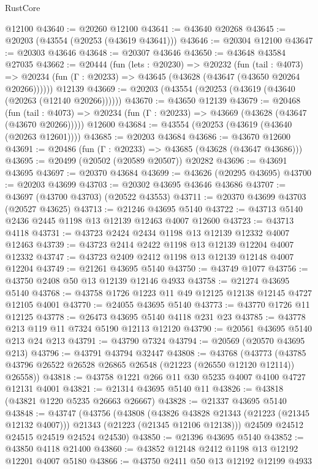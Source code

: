 \begin{lexlean}{RustCore}
\begin{coremodule}
    @12100
@43640 := @20260 @12100
@43641 := @43640 @20268
@43645 := @20203 (@43554 (@20253 (@43619 @43641)))
@43646 := @20304 @12100
@43647 := @20303 @43646
@43648 := @20307 @43646
@43650 := @43648 @43584 @27035
@43662 := @20444
    (fun (lets : @20230) =>
    @20232
      (fun (tail : @4073) =>
      @20234 (fun (Γ : @20233) => @43645 (@43628 (@43647 (@43650 @20264 @20266))))))
    @12139
@43669 := @20203 (@43554 (@20253 (@43619 (@43640 (@20263 (@12140 @20266))))))
@43670 := @43650 @12139
@43679 := @20468
    (fun (tail : @4073) => @20234 (fun (Γ : @20233) => @43669 (@43628 (@43647 (@43670 @20266)))))
    @12600
@43684 := @43554 (@20253 (@43619 (@43640 (@20263 @12601))))
@43685 := @20203 @43684
@43686 := @43670 @12600
@43691 := @20486 (fun (Γ : @20233) => @43685 (@43628 (@43647 @43686)))
@43695 := @20499 (@20502 (@20589 @20507)) @20282
@43696 := @43691 @43695
@43697 := @20370 @43684
@43699 := @43626 (@20295 @43695)
@43700 := @20203 @43699
@43703 := @20302 @43695 @43646 @43686
@43707 := @43697 (@43700 @43703) (@20522 @43553)
@43711 := @20370 @43699 @43703 (@20527 @43625)
@43713 := @21246 @43695 @5140
@43722 := @43713 @5140 @2436 @2445 @1198 @13 @12139 @12463 @4007 @12600
@43723 := @43713 @4118
@43731 := @43723 @2424 @2434 @1198 @13 @12139 @12332 @4007 @12463
@43739 := @43723 @2414 @2422 @1198 @13 @12139 @12204 @4007 @12332
@43747 := @43723 @2409 @2412 @1198 @13 @12139 @12148 @4007 @12204
@43749 := @21261 @43695 @5140
@43750 := @43749 @1077
@43756 := @43750 @2408 @50 @13 @12139 @12146 @4933
@43758 := @21274 @43695 @5140
@43768 := @43758 @1726 @1223 @11 @49 @12125 @12138 @12145 @4727 @12105 @4001
@43770 := @24055 @43695 @5140
@43773 := @43770 @1726 @11 @12125
@43778 := @26473 @43695 @5140 @4118 @231 @23
@43785 := @43778 @213 @119 @11 @7324 @5190 @12113 @12120
@43790 := @20561 @43695 @5140 @213 @24 @213
@43791 := @43790 @7324
@43794 := @20569 (@20570 @43695 @213)
@43796 := @43791 @43794 @32447
@43808 := @43768
    (@43773 (@43785 @43796 @26522 @26528 @26865 @26548 (@21223 (@26550 @12120 @12114)) @26558))
@43818 := @43758 @1221 @266 @11 @30 @5235 @4007 @4100 @4727 @12131 @4001
@43821 := @21314 @43695 @5140 @11
@43826 := @43818 (@43821 @1220 @5235 @26663 @26667)
@43828 := @21337 @43695 @5140
@43848 := @43747
    (@43756
      (@43808
        (@43826 @43828 @21343 (@21223 (@21345 @12132 @4007)))
        @21343
        (@21223 (@21345 @12106 @12138)))
      @24509
      @24512
      @24515
      @24519
      @24524
      @24530)
@43850 := @21396 @43695 @5140
@43852 := @43850 @4118 @21400
@43860 := @43852 @12148 @2412 @1198 @13 @12192 @12201 @4007 @5180
@43866 := @43750 @2411 @50 @13 @12192 @12199 @4933

\end{coremodule}
\end{lexlean}
